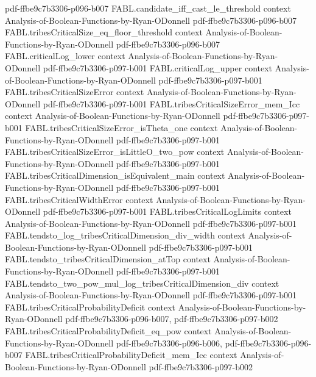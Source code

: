 \begin{theorem}
  {pdf-ffbe9c7b3306-p096-b007}
\proofstep
  {FABL.candidate_iff_cast_le_threshold}
  {context}
  {Analysis-of-Boolean-Functions-by-Ryan-ODonnell}
  {pdf-ffbe9c7b3306-p096-b007}
\proofstep
  {FABL.tribesCriticalSize_eq_floor_threshold}
  {context}
  {Analysis-of-Boolean-Functions-by-Ryan-ODonnell}
  {pdf-ffbe9c7b3306-p096-b007}
\proofstep
  {FABL.criticalLog_lower}
  {context}
  {Analysis-of-Boolean-Functions-by-Ryan-ODonnell}
  {pdf-ffbe9c7b3306-p097-b001}
\proofstep
  {FABL.criticalLog_upper}
  {context}
  {Analysis-of-Boolean-Functions-by-Ryan-ODonnell}
  {pdf-ffbe9c7b3306-p097-b001}
\proofstep
  {FABL.tribesCriticalSizeError}
  {context}
  {Analysis-of-Boolean-Functions-by-Ryan-ODonnell}
  {pdf-ffbe9c7b3306-p097-b001}
\proofstep
  {FABL.tribesCriticalSizeError_mem_Icc}
  {context}
  {Analysis-of-Boolean-Functions-by-Ryan-ODonnell}
  {pdf-ffbe9c7b3306-p097-b001}
\proofstep
  {FABL.tribesCriticalSizeError_isTheta_one}
  {context}
  {Analysis-of-Boolean-Functions-by-Ryan-ODonnell}
  {pdf-ffbe9c7b3306-p097-b001}
\proofstep
  {FABL.tribesCriticalSizeError_isLittleO_two_pow}
  {context}
  {Analysis-of-Boolean-Functions-by-Ryan-ODonnell}
  {pdf-ffbe9c7b3306-p097-b001}
\proofstep
  {FABL.tribesCriticalDimension_isEquivalent_main}
  {context}
  {Analysis-of-Boolean-Functions-by-Ryan-ODonnell}
  {pdf-ffbe9c7b3306-p097-b001}
\proofstep
  {FABL.tribesCriticalWidthError}
  {context}
  {Analysis-of-Boolean-Functions-by-Ryan-ODonnell}
  {pdf-ffbe9c7b3306-p097-b001}
\proofstep
  {FABL.tribesCriticalLogLimits}
  {context}
  {Analysis-of-Boolean-Functions-by-Ryan-ODonnell}
  {pdf-ffbe9c7b3306-p097-b001}
\proofstep
  {FABL.tendsto_log_tribesCriticalDimension_div_width}
  {context}
  {Analysis-of-Boolean-Functions-by-Ryan-ODonnell}
  {pdf-ffbe9c7b3306-p097-b001}
\proofstep
  {FABL.tendsto_tribesCriticalDimension_atTop}
  {context}
  {Analysis-of-Boolean-Functions-by-Ryan-ODonnell}
  {pdf-ffbe9c7b3306-p097-b001}
\proofstep
  {FABL.tendsto_two_pow_mul_log_tribesCriticalDimension_div}
  {context}
  {Analysis-of-Boolean-Functions-by-Ryan-ODonnell}
  {pdf-ffbe9c7b3306-p097-b001}
\proofstep
  {FABL.tribesCriticalProbabilityDeficit}
  {context}
  {Analysis-of-Boolean-Functions-by-Ryan-ODonnell}
  {pdf-ffbe9c7b3306-p096-b007,
    pdf-ffbe9c7b3306-p097-b002}
\proofstep
  {FABL.tribesCriticalProbabilityDeficit_eq_pow}
  {context}
  {Analysis-of-Boolean-Functions-by-Ryan-ODonnell}
  {pdf-ffbe9c7b3306-p096-b006,
    pdf-ffbe9c7b3306-p096-b007}
\proofstep
  {FABL.tribesCriticalProbabilityDeficit_mem_Icc}
  {context}
  {Analysis-of-Boolean-Functions-by-Ryan-ODonnell}
  {pdf-ffbe9c7b3306-p097-b002}

\end{theorem}
